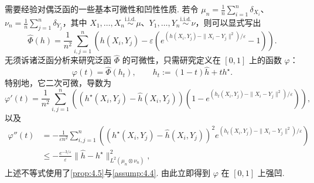 需要经验对偶泛函的一些基本可微性和凹性性质. 若令 $\mu_n=\frac1n\sum_{i=1}^n\delta_{X_i}$、$\nu_n=\frac1n\sum_{j=1}^n\delta_{Y_j}$，其中 $X_1,\ldots,X_n\overset{\mathrm{i.i.d.}}\sim\mu$、$Y_1,\ldots,Y_n\overset{\mathrm{i.i.d.}}\sim\nu$，则可以显式写出
\begin{equation}\label{eq:4.14}
\widehat\Phi(h)=\frac1{n^2}\sum_{i,j=1}^n
\left(h(X_i,Y_j)-\varepsilon\left(e^{(h(X_i,Y_j)-\|X_i-Y_j\|^2)/\varepsilon}-1\right)\right).
\end{equation}
无须诉诸泛函分析来研究泛函 $\widehat\Phi$ 的可微性，只需研究定义在 $[0,1]$ 上的函数 $\varphi$：
\begin{equation}\label{eq:4.15}
\varphi(t)=\widehat\Phi(h_t),\qquad h_t:=(1-t)\widehat h+th^\star.
\end{equation}
特别地，它二次可微，导数为
\begin{equation}\label{eq:4.16}
\varphi'(t)=\frac1{n^2}\sum_{i,j=1}^n
\left((h^\star(X_i,Y_j)-\widehat h(X_i,Y_j))
\left(1-e^{(h_t(X_i,Y_j)-\|X_i-Y_j\|^2)/\varepsilon}\right)\right),
\end{equation}
以及
\begin{equation}\label{eq:4.17}
\begin{aligned}
\varphi''(t)&=-\frac1{\varepsilon n^2}\sum_{i,j=1}^n
\left((h^\star(X_i,Y_j)-\widehat h(X_i,Y_j))^2
e^{(h_t(X_i,Y_j)-\|X_i-Y_j\|^2)/\varepsilon}\right)\\
&\le-\frac{e^{-3/\varepsilon}}\varepsilon\|\widehat h-h^\star\|_{L^2(\mu_n\otimes\nu_n)}^2,
\end{aligned}
\end{equation}
上述不等式使用了\autoref{prop:4.5}与\autoref{assump:4.4}. 由此立即得到 $\varphi$ 在 $[0,1]$ 上强凹.

